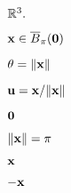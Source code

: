\documentclass[10pt]{book}
\begin{document}
\begin{mdSnippets}
\begin{mdInlineSnippet}[19079f9300ede2ad4931825d38362a9c]
$\mathbb{R}^3.$\end{mdInlineSnippet}%
\begin{mdInlineSnippet}[ed7b65be131083953cf69d4150d078b5]%
$\mathbf{x} \in \overline{B}_\pi(\mathbf{0})$\end{mdInlineSnippet}%
\begin{mdInlineSnippet}[c49db7f7d75ad5128170eee571794ea4]%
$\theta = \norm{\mathbf{x}}$\end{mdInlineSnippet}%
\begin{mdInlineSnippet}%
$\mathbf{u} = \mathbf{x} / \norm{\mathbf{x}}$\end{mdInlineSnippet}%
\begin{mdInlineSnippet}%
$\mathbf{0}$\end{mdInlineSnippet}%
\begin{mdInlineSnippet}[3d2e1e9d6007c0033933403a98de8ed3]%
$\norm{\mathbf{x}} = \pi$\end{mdInlineSnippet}%
\begin{mdInlineSnippet}[bc1d6e62de2a70007201aa9789a7ec77]%
$\mathbf{x}$\end{mdInlineSnippet}%
\begin{mdInlineSnippet}[37dd2e4dd36db7b962583f67f5c088a5]%
$-\mathbf{x}$\end{mdInlineSnippet}%

\end{mdSnippets}
\end{document}
